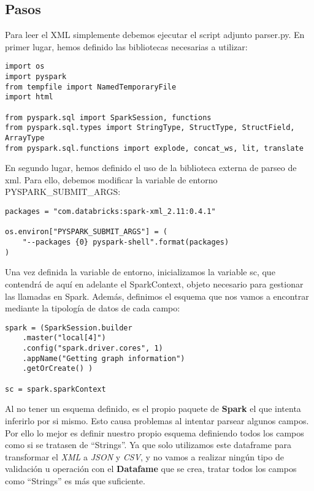 \subsection{Pasos}

Para leer el XML simplemente debemos ejecutar el script adjunto parser.py. En primer lugar, hemos definido las bibliotecas necesarias a utilizar:

\begin{verbatim}
import os
import pyspark
from tempfile import NamedTemporaryFile
import html

from pyspark.sql import SparkSession, functions
from pyspark.sql.types import StringType, StructType, StructField, ArrayType
from pyspark.sql.functions import explode, concat_ws, lit, translate
\end{verbatim}
 

En segundo lugar, hemos definido el uso de la biblioteca externa de parseo de xml. Para ello, debemos modificar la variable de entorno PYSPARK_SUBMIT_ARGS:

\begin{verbatim}
packages = "com.databricks:spark-xml_2.11:0.4.1"

os.environ["PYSPARK_SUBMIT_ARGS"] = (
    "--packages {0} pyspark-shell".format(packages)
)
\end{verbatim}

Una vez definida la variable de entorno, inicializamos la variable sc, que contendrá de aquí en adelante el SparkContext, objeto necesario para gestionar las llamadas en Spark. Además, definimos el esquema que nos vamos a encontrar mediante la tipología de datos de cada campo:

\begin{verbatim}
spark = (SparkSession.builder
    .master("local[4]")
    .config("spark.driver.cores", 1)
    .appName("Getting graph information")
    .getOrCreate() )
    
sc = spark.sparkContext
\end{verbatim}

Al no tener un esquema definido, es el propio paquete de \textbf{Spark} el que intenta inferirlo por si mismo. Esto causa problemas al intentar parsear algunos campos. Por ello lo mejor es definir nuestro propio esquema definiendo todos los campos como si se tratasen de ``Strings''. Ya que solo utilizamos este dataframe para transformar el \textit{XML} a \textit{JSON} y \textit{CSV}, y no vamos a realizar ningún tipo de validación u operación con el \textbf{Datafame} que se crea, tratar todos los campos como ``Strings'' es más que suficiente.

